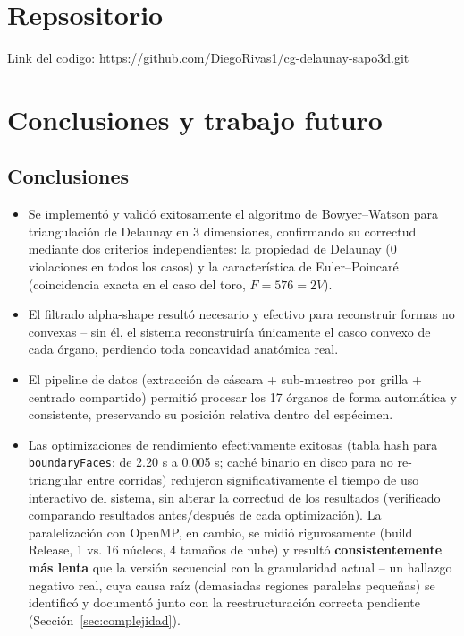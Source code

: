 \documentclass[12pt,a4paper]{article}
\begin{document}
%
\section{Repsositorio}
Link del codigo:
\url{https://github.com/DiegoRivas1/cg-delaunay-sapo3d.git}


%


\section{Conclusiones y trabajo futuro}

\subsection*{Conclusiones}

\begin{itemize}
    \item Se implementó y validó exitosamente el algoritmo de
    Bowyer--Watson para triangulación de Delaunay en 3 dimensiones,
    confirmando su correctud mediante dos criterios independientes: la
    propiedad de Delaunay (0 violaciones en todos los casos) y la
    característica de Euler--Poincaré (coincidencia exacta en el caso
    del toro, $F=576=2V$).
    \item El filtrado alpha-shape resultó necesario y efectivo para
    reconstruir formas no convexas -- sin él, el sistema reconstruiría
    únicamente el casco convexo de cada órgano, perdiendo toda
    concavidad anatómica real.
    \item El pipeline de datos (extracción de cáscara + sub-muestreo
    por grilla + centrado compartido) permitió procesar los 17 órganos
    de forma automática y consistente, preservando su posición relativa
    dentro del espécimen.
    \item Las optimizaciones de rendimiento efectivamente exitosas
    (tabla hash para \texttt{boundaryFaces}: de 2.20 s a 0.005 s; caché
    binario en disco para no re-triangular entre corridas) redujeron
    significativamente el tiempo de uso interactivo del sistema, sin
    alterar la correctud de los resultados (verificado comparando
    resultados antes/después de cada optimización). La paralelización
    con OpenMP, en cambio, se midió rigurosamente (build Release, 1 vs.
    16 núcleos, 4 tamaños de nube) y resultó \textbf{consistentemente
    más lenta} que la versión secuencial con la granularidad actual --
    un hallazgo negativo real, cuya causa raíz (demasiadas regiones
    paralelas pequeñas) se identificó y documentó junto con la
    reestructuración correcta pendiente (Sección~\ref{sec:complejidad}).
\end{itemize}
\end{document}
